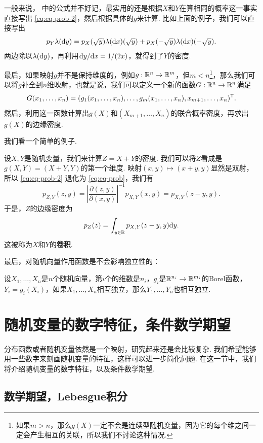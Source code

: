 一般来说， 中的公式并不好记，最实用的还是根据$X$和$Y$在算相同的概率这一事实直接写出 \eqref{eq:eq-prob-2}，然后根据具体的$g$来计算. 比如上面的例子，我们可以直接写出
\[p_Y\lambda(\mathrm{d} y)=p_X(\sqrt{y})\lambda(\mathrm{d} x)(\sqrt{y})+p_X(-\sqrt{y})\lambda(\mathrm{d} x)(-\sqrt{y}).\]
两边除以$\lambda(\mathrm{d} y)$，再利用$\mathrm{d} y/\mathrm{d} x=1/(2x)$，就得到了$Y$的密度. 

最后，如果映射$g$并不是保持维度的，例如$g:\mathbb{R}^n\to\mathbb{R}^m$，但$m<n$\footnote{如果$m>n$，那么$g(X)$一定不会是连续型随机变量，因为它的每个维之间一定会产生相互的关联，所以我们不讨论这种情况. }，那么我们可以将$g$补全到$n$维映射，也就是说，我们可以定义一个新的函数$G:\mathbb{R}^n\to\mathbb{R}^n$满足
\[G(x_1,\dots,x_n)=(g_1(x_1,\dots,x_n),\dots,g_m(x_1,\dots,x_n),x_{m+1},\dots,x_n)^{\mathsf{T}}.\]
然后，利用这一函数计算出$g(X)$和$(X_{m+1},\dots,X_n)$的联合概率密度，再求出$g(X)$的边缘密度. 

我们看一个简单的例子. 

\begin{example}[卷积]
设$X,Y$是随机变量，我们来计算$Z=X+Y$的密度. 我们可以将$Z$看成是$g(X,Y)=(X+Y,Y)$的第一个维度. 映射$(x,y)\mapsto(x+y,y)$显然是双射，所以 \eqref{eq:eq-prob-2} 退化为 \eqref{eq:eq-prob}，我们有
\[p_{Z,Y}(z,y)=\left|\frac{\partial(z,y)}{\partial(x,y)}\right|^{-1}p_{X,Y}(x,y)=p_{X,Y}(z-y,y).\]
于是，$Z$的边缘密度为
\[p_Z(z)=\int_{y\in\mathbb{R}}p_{X,Y}(z-y,y)\mathrm{d} y.\]
这被称为$X$和$Y$的\textbf{卷积}. 
\end{example}

最后，对随机向量作用函数是不会影响独立性的：

\begin{proposition}\label{proposition:independence-function}
设$X_1,\dots,X_n$是$n$个随机向量，第$i$个的维数是$n_i$，$g_i$是$\mathbb{R}^{n_i}\to\mathbb{R}^{m_i}$的Borel函数，$Y_i=g_i(X_i)$，如果$X_1,\dots,X_n$相互独立，那么$Y_1,\dots,Y_n$也相互独立. 
\end{proposition}

\section{随机变量的数字特征，条件数学期望}\label{sec:expectation}

分布函数或者随机变量依然是一个映射，研究起来还是会比较复杂. 我们希望能够用一些数字来刻画随机变量的特征，这样可以进一步简化问题. 在这一节中，我们将介绍随机变量的数字特征，以及条件数学期望. 

\subsection{数学期望，Lebesgue积分}

